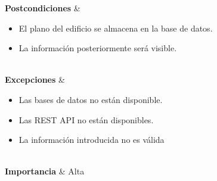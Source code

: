 {	\textbf{Postcondiciones} 		& 
	\begin{itemize}
		\item El plano del edificio se almacena en la base de datos.
		\item La información posteriormente será visible.
	\end{itemize}
	\\
	\textbf{Excepciones} 			& 
	\begin{itemize}
		\item Las bases de datos no están disponible.
		\item Las REST API no están disponibles.
		\item La información introducida no es válida
	\end{itemize}
	
	\\
	\textbf{Importancia} 			& Alta\\}


